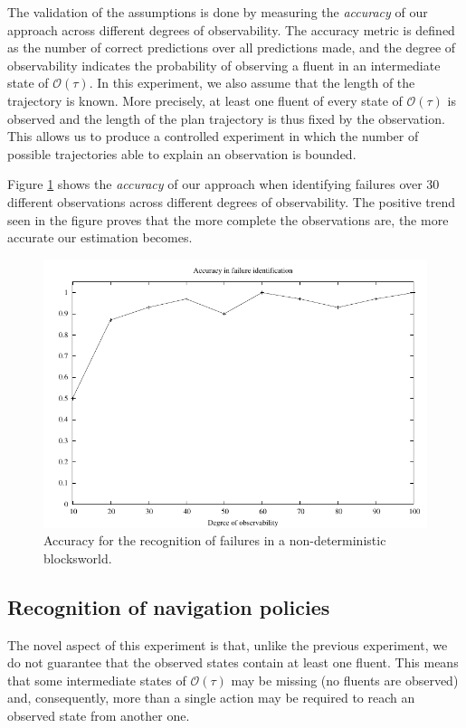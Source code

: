 \documentclass[letterpaper]{article} %
\begin{document}
The validation of the assumptions is done by measuring the {\em  accuracy} of our approach across different degrees of observability. The accuracy metric is defined as the number of correct predictions over all predictions made, and the degree of observability indicates the probability of observing a fluent in an intermediate state of $\mathcal{O}(\tau)$. In this experiment, we also assume that the length of the trajectory is known. More precisely, at least one fluent of every state of $\mathcal{O}(\tau)$ is observed and the length of the plan trajectory is thus fixed by the observation. This allows us to produce a controlled experiment in which the number of possible trajectories able to explain an observation is bounded.


Figure \ref{fig:blocks_acc} shows the {\em accuracy} of our approach when identifying failures over 30 different observations across different degrees of observability. The positive trend seen in the figure proves that the more complete the observations are, the more accurate our estimation becomes.


\begin{figure}
	\centering
	\includegraphics[width=.95\columnwidth]{fig_blocks.pdf}
	\caption{Accuracy for the recognition of failures in a non-deterministic blocksworld.}
	\label{fig:blocks_acc}
\end{figure}



\subsection{Recognition of navigation policies}

The novel aspect of this experiment is that, unlike the previous experiment, we do not guarantee that the observed states contain at least one fluent. This means that some intermediate states of $\mathcal{O}(\tau)$ may be missing (no fluents are observed) and, consequently, more than a single action may be required to reach an observed state from another one.
\end{document}
